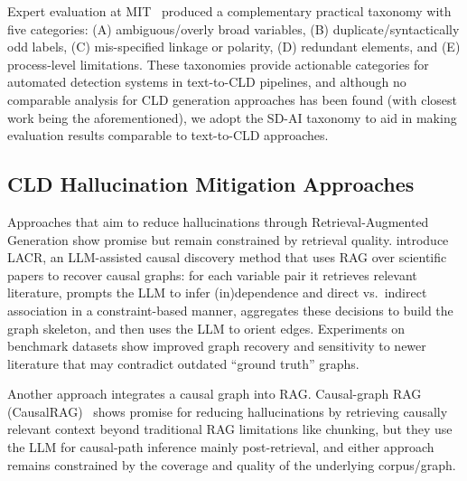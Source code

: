 Expert evaluation at MIT~\citep{reinholtz2025pipelinealgebra} produced a complementary practical taxonomy with five categories: (A) ambiguous/overly broad variables, (B) duplicate/syntactically odd labels, (C) mis-specified linkage or polarity, (D) redundant elements, and (E) process-level limitations. These taxonomies provide actionable categories for automated detection systems in text-to-CLD pipelines, and although no comparable analysis for CLD generation approaches has been found (with closest work being the aforementioned), we adopt the SD-AI taxonomy to aid in making evaluation results comparable to text-to-CLD approaches.

\subsection{CLD Hallucination Mitigation Approaches}

Approaches that aim to reduce hallucinations through Retrieval-Augmented Generation show promise but remain constrained by retrieval quality. \citet{zhang2024causal} introduce LACR, an LLM-assisted causal discovery method that uses RAG over scientific papers to recover causal graphs: for each variable pair it retrieves relevant literature, prompts the LLM to infer (in)dependence and direct vs.\ indirect association in a constraint-based manner, aggregates these decisions to build the graph skeleton, and then uses the LLM to orient edges. Experiments on benchmark datasets show improved graph recovery and sensitivity to newer literature that may contradict outdated ``ground truth'' graphs.

Another approach integrates a causal graph into RAG. Causal-graph RAG (CausalRAG)~\citep{wang2025causalrag} shows promise for reducing hallucinations by retrieving causally relevant context beyond traditional RAG limitations like chunking, but they use the LLM for causal-path inference mainly post-retrieval, and either approach remains constrained by the coverage and quality of the underlying corpus/graph.

